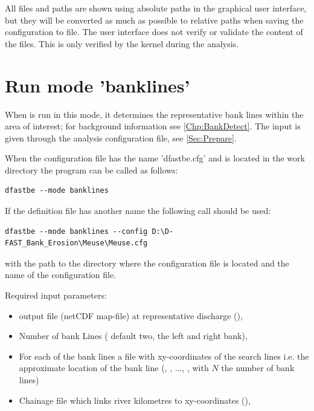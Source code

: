 \Note All files and paths are shown using absolute paths in the graphical user interface, but they will be converted as much as possible to relative paths when saving the configuration to file.
The user interface does not verify or validate the content of the files.
This is only verified by the kernel during the analysis.

\section{Run mode 'banklines'} \label{Sec:rundetect}

When \dfastbe is run in this mode, it determines the representative bank lines within the area of interest; for background information see \autoref{Chp:BankDetect}.
The input is given through the analysis configuration file, see \autoref{Sec:Prepare}.

When the configuration file has the name 'dfastbe.cfg' and is located in the work directory the program can be called as follows:

\begin{Verbatim}
dfastbe --mode banklines
\end{Verbatim}

If the definition file has another name the following call should be used:

\begin{Verbatim}
dfastbe --mode banklines --config D:\D-FAST_Bank_Erosion\Meuse\Meuse.cfg
\end{Verbatim}

with  the path to the directory where the configuration file is located and  the name of the configuration file.

Required input parameters:

\begin{itemize}
\item \dflowfm output file (netCDF map-file) at representative discharge (),
\item Number of bank Lines ( default two, the left and right bank),
\item For each of the bank lines a file with xy-coordinates of the search lines i.e. the approximate location of the bank line (, , ..., , with $N$ the number of bank lines)
\item Chainage file which links river kilometres to xy-coordinates (),
\end{itemize}

